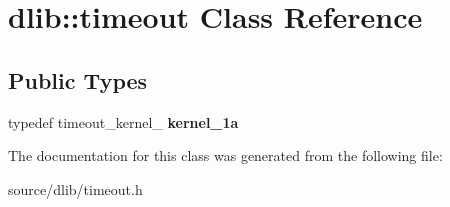 \hypertarget{classdlib_1_1timeout}{
\section{dlib::timeout Class Reference}
\label{classdlib_1_1timeout}
}
\subsection*{Public Types}
\begin{DoxyCompactItemize}
\item 
\hypertarget{classdlib_1_1timeout_a8d5bec12c05ab4abbe113cbcfcb152b1}{
typedef timeout\_\-kernel\_ {\bfseries kernel\_\-1a}}
\label{classdlib_1_1timeout_a8d5bec12c05ab4abbe113cbcfcb152b1}

\end{DoxyCompactItemize}


The documentation for this class was generated from the following file:\begin{DoxyCompactItemize}
\item 
source/dlib/timeout.h\end{DoxyCompactItemize}
